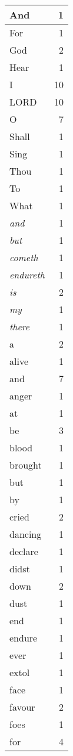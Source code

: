 \begin{center}
\begin{longtable}{l|r}
\hline \hline
\endlastfoot
And & 1 \\ \hline
For & 1 \\ \hline
God & 2 \\ \hline
Hear & 1 \\ \hline
I & 10 \\ \hline
LORD & 10 \\ \hline
O & 7 \\ \hline
Shall & 1 \\ \hline
Sing & 1 \\ \hline
Thou & 1 \\ \hline
To & 1 \\ \hline
What & 1 \\ \hline
\emph{and} & 1 \\ \hline
\emph{but} & 1 \\ \hline
\emph{cometh} & 1 \\ \hline
\emph{endureth} & 1 \\ \hline
\emph{is} & 2 \\ \hline
\emph{my} & 1 \\ \hline
\emph{there} & 1 \\ \hline
a & 2 \\ \hline
alive & 1 \\ \hline
and & 7 \\ \hline
anger & 1 \\ \hline
at & 1 \\ \hline
be & 3 \\ \hline
blood & 1 \\ \hline
brought & 1 \\ \hline
but & 1 \\ \hline
by & 1 \\ \hline
cried & 2 \\ \hline
dancing & 1 \\ \hline
declare & 1 \\ \hline
didst & 1 \\ \hline
down & 2 \\ \hline
dust & 1 \\ \hline
end & 1 \\ \hline
endure & 1 \\ \hline
ever & 1 \\ \hline
extol & 1 \\ \hline
face & 1 \\ \hline
favour & 2 \\ \hline
foes & 1 \\ \hline
for & 4 \\ \hline

\end{longtable}
\end{center}

